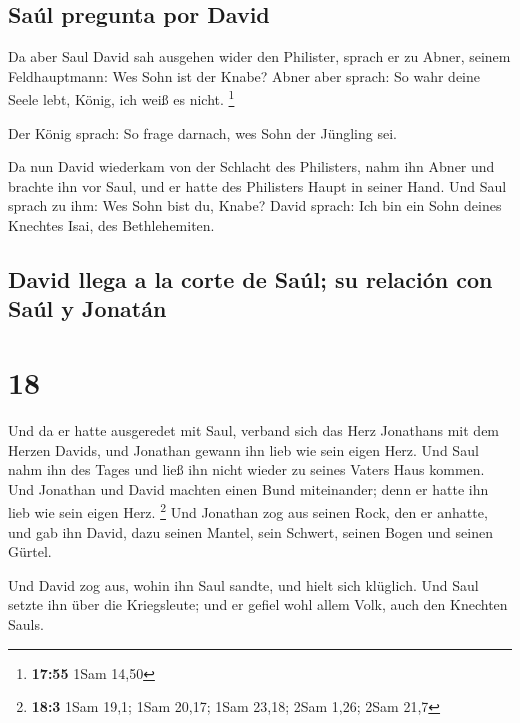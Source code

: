 \hypertarget{sauxfal-pregunta-por-david}{%
\subsection{Saúl pregunta por David}\label{sauxfal-pregunta-por-david}}

 Da aber Saul David sah ausgehen wider den Philister,
sprach er zu Abner, seinem Feldhauptmann: Wes Sohn ist der Knabe? Abner
aber sprach: So wahr deine Seele lebt, König, ich weiß es nicht.
\footnote{\textbf{17:55} 1Sam 14,50}

 Der König sprach: So frage darnach, wes Sohn der
Jüngling sei.

 Da nun David wiederkam von der Schlacht des Philisters,
nahm ihn Abner und brachte ihn vor Saul, und er hatte des Philisters
Haupt in seiner Hand.  Und Saul sprach zu ihm: Wes Sohn
bist du, Knabe? David sprach: Ich bin ein Sohn deines Knechtes Isai, des
Bethlehemiten.

\hypertarget{david-llega-a-la-corte-de-sauxfal-su-relaciuxf3n-con-sauxfal-y-jonatuxe1n}{%
\subsection{David llega a la corte de Saúl; su relación con Saúl y
Jonatán}\label{david-llega-a-la-corte-de-sauxfal-su-relaciuxf3n-con-sauxfal-y-jonatuxe1n}}

\hypertarget{section-17}{%
\section{18}\label{section-17}}

 Und da er hatte ausgeredet mit Saul, verband sich das
Herz Jonathans mit dem Herzen Davids, und Jonathan gewann ihn lieb wie
sein eigen Herz.  Und Saul nahm ihn des Tages und ließ ihn
nicht wieder zu seines Vaters Haus kommen.  Und Jonathan
und David machten einen Bund miteinander; denn er hatte ihn lieb wie
sein eigen Herz. \footnote{\textbf{18:3} 1Sam 19,1; 1Sam 20,17; 1Sam
  23,18; 2Sam 1,26; 2Sam 21,7}  Und Jonathan zog aus
seinen Rock, den er anhatte, und gab ihn David, dazu seinen Mantel, sein
Schwert, seinen Bogen und seinen Gürtel.

 Und David zog aus, wohin ihn Saul sandte, und hielt sich
klüglich. Und Saul setzte ihn über die Kriegsleute; und er gefiel wohl
allem Volk, auch den Knechten Sauls.

